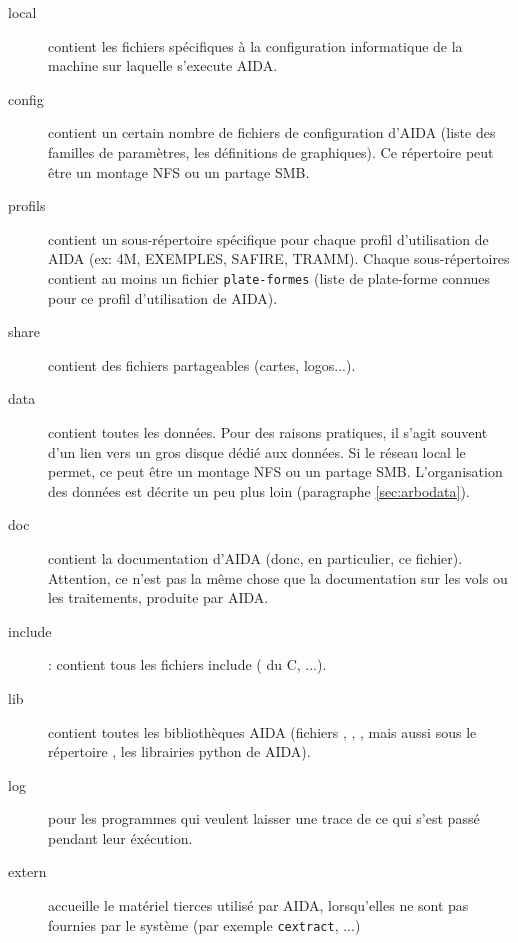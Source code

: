 \begin{description}
  \item[local] contient les fichiers spécifiques à la configuration 
   informatique de la machine sur laquelle s'execute AIDA.

  \item[config] contient un certain nombre de fichiers 
   de configuration d'AIDA (liste des familles de paramètres, les définitions
   de graphiques).
   Ce répertoire peut être un montage NFS ou un partage SMB.

  \item[profils] contient un sous-répertoire spécifique pour chaque profil
   d'utilisation de AIDA (ex: 4M, EXEMPLES, SAFIRE, TRAMM).
   Chaque sous-répertoires contient au moins un fichier \texttt{plate-formes}
   (liste de plate-forme connues pour ce profil d'utilisation de AIDA).

  \item[share] contient des fichiers partageables (cartes, logos...).

  \item[data] contient toutes les données. Pour des raisons pratiques,
   il s'agit souvent d'un lien vers un gros disque dédié aux données.
   Si le réseau local le permet, ce peut être un montage NFS ou un
   partage SMB.
   L'organisation des données est décrite un peu plus loin 
   (paragraphe \ref{sec:arbodata}).

  \item[doc] contient la documentation d'AIDA (donc, en particulier, ce
   fichier). Attention, ce n'est pas la même chose que la documentation
   sur les vols ou les traitements, produite par AIDA.

  \item[include] : contient tous les fichiers include ( du C, ...).

  \item[lib] contient toutes les bibliothèques AIDA (fichiers , 
   , ,  mais aussi sous le répertoire
   , les librairies python de AIDA).

  \item[log] pour les programmes qui veulent laisser une trace de ce qui
   s'est passé pendant leur éxécution.

  \item[extern] accueille le matériel tierces utilisé par AIDA, lorsqu'elles
   ne sont pas fournies par le système (par exemple \texttt{cextract}, ...)
\end{description}
 
